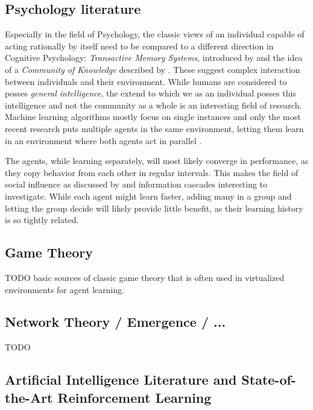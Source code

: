 \documentclass[12pt,a4paper]{article}
\begin{document}
\subsection{Psychology literature}
Especially in the field of Psychology, the classic views of an individual capable of acting rationally by itself need to be compared to a different direction in Cognitive Psychology: \emph{Transactive Memory Systems}, introduced by \citeauthor{wegner1995computer} and the idea of a \emph{Community of Knowledge} described by \citeauthor{sloman2016cok}. These suggest complex interaction between individuals and their environment.
While humans are considered to posses \emph{general intelligence}, the extend to which we as an individual posses this intelligence and not the community as a whole is an interesting field of research. Machine learning algorithms mostly focus on single instances \cite[p.693ff.]{russell2016artificial} and only the most recent research puts multiple agents in the same environment, letting them learn in an environment where both agents act in parallel \cite{bansal2017emergent}.

The agents, while learning separately, will most likely converge in performance, as they copy behavior from each other in regular intervals. This makes the field of social influence as discussed by \citeauthor{hirshleifer1994blind} and information cascades \cite{2015-45614-00120160201} interesting to investigate. While each agent might learn faster, adding many in a group and letting the group decide will likely provide little benefit, as their learning history is so tightly related.

\subsection{Game Theory}
TODO basic sources of classic game theory that is often used in virtualized environments for agent learning.

\subsection{Network Theory / Emergence / ...}
TODO


\subsection{Artificial Intelligence Literature and State-of-the-Art Reinforcement Learning}
\end{document}
